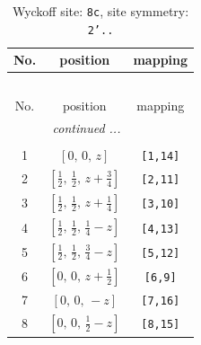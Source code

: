\documentclass[fleqn,8pt]{jsarticle}
\begin{document}
\renewcommand{\arraystretch}{1.2}
\begin{longtable}{ccc}
\caption{Wyckoff site: {\tt 8c}, site symmetry: {\tt 2'..}}
 \\
 \hline \hline
No. & position & mapping \\ \hline \endfirsthead

\multicolumn{2}{l}{\tablename\ \thetable{}} \\
 \hline \hline
No. & position & mapping \\ \hline \endhead

 \hline \hline
\multicolumn{2}{r}{\footnotesize\it continued ...} \\ \endfoot

 \hline \hline
\multicolumn{2}{r}{} \\ \endlastfoot

1 & $\left[ 0,\, 0,\, z \right]$ & {\tt [1,14]} \\ \hline
2 & $\left[ \frac{1}{2},\, \frac{1}{2},\, z + \frac{3}{4} \right]$ & {\tt [2,11]} \\ \hline
3 & $\left[ \frac{1}{2},\, \frac{1}{2},\, z + \frac{1}{4} \right]$ & {\tt [3,10]} \\ \hline
4 & $\left[ \frac{1}{2},\, \frac{1}{2},\, \frac{1}{4} - z \right]$ & {\tt [4,13]} \\ \hline
5 & $\left[ \frac{1}{2},\, \frac{1}{2},\, \frac{3}{4} - z \right]$ & {\tt [5,12]} \\ \hline
6 & $\left[ 0,\, 0,\, z + \frac{1}{2} \right]$ & {\tt [6,9]} \\ \hline
7 & $\left[ 0,\, 0,\, - z \right]$ & {\tt [7,16]} \\ \hline
8 & $\left[ 0,\, 0,\, \frac{1}{2} - z \right]$ & {\tt [8,15]} \\
\end{longtable}
\renewcommand{\arraystretch}{1.2}
\end{document}
